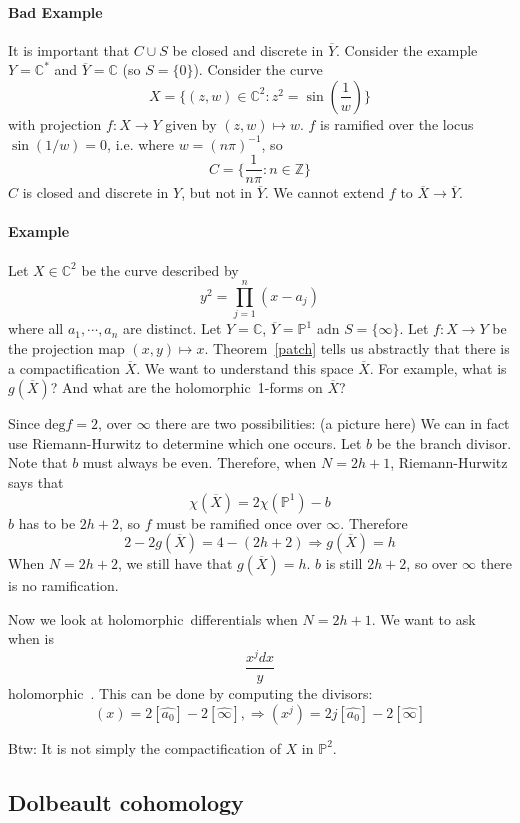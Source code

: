 \documentclass[12pt]{article}
\theoremstyle{plain}
\theoremstyle{definition}
\newcommand{\IC}{\mathbb{C}}
\newcommand{\IP}{\mathbb{P}}
\newcommand{\IZ}{\mathbb{Z}}
\renewcommand{\deg}{\mathrm{deg}}
\newcommand{\<}{\langle}
\renewcommand{\>}{\rangle}
\def\what{\widehat}
\newcommand{\holo}{holomorphic \,}
\begin{document}
\paragraph{Bad Example} It is important that $C \cup S$ be closed and discrete in $\overline{Y}$. Consider the example $Y = \IC^*$ and $\overline{Y} = \IC$ (so $S = \{0\}$). Consider the curve 
$$X =  \{ (z, w) \in \IC^2 : z^2 = \sin(\frac{1}{w}) \}  $$
with projection $f : X \to Y$ given by $(z, w) \mapsto w$. $f$ is ramified over the locus $\sin(1/w) = 0$, i.e. where $w = (n \pi)^{-1}$, so 
$$ C = \{ \frac{1}{n \pi} : n \in \IZ \} $$
$C$ is closed and discrete in $Y$, but not in $\overline{Y}$. We cannot extend $f$ to $\overline{X} \to \overline{Y}$.

\paragraph{Example} Let $X \in \IC^2$ be the curve described by $$y^2 = \prod_{j = 1}^n (x - a_j)$$ where all $a_1, \cdots, a_n$ are distinct. Let $Y = \IC$, $\overline{Y} = \IP^1$ adn $S = \{ \infty \}$. Let $f : X \to Y$ be the projection map $(x, y) \mapsto x$. Theorem~\ref{patch} tells us abstractly that there is a compactification $\overline{X}$. We want to understand this space $\overline{X}$. For example, what is $g(\overline{X})$? And what are the \holo 1-forms on $\overline{X}$?

Since $\deg f = 2$, over $\infty$ there are two possibilities:
(a picture here)
We can in fact use Riemann-Hurwitz to determine which one occurs. Let $b$ be the branch divisor. Note that $b$ must always be even. Therefore, when $N = 2h + 1$, Riemann-Hurwitz says that 
$$ \chi(\overline{X}) = 2 \chi(\IP^1) - b $$
$b$ has to be $2h + 2$, so $f$ must be ramified once over $\infty$. Therefore 
$$ 2 - 2g(\overline{X}) = 4 - (2h + 2) \Rightarrow g(\overline{X}) = h $$
When $N = 2h + 2$, we still have that $g(\overline{X}) = h$. $b$ is still $2h + 2$, so over $\infty$ there is no ramification.  

Now we look at \holo differentials when $N = 2h + 1$. We want to ask when is 
$$ \frac{x^j dx}{y} $$
\holo. This can be done by computing the divisors: 
$$ (x) = 2 [\what{a_0}] - 2 [\what{\infty}],  \Rightarrow (x^j) = 2j [\what{a_0}] - 2 [\what{\infty}]$$

Btw: It is not simply the compactification of $X$ in $\IP^2$.

\subsection{Dolbeault cohomology}
\end{document}
